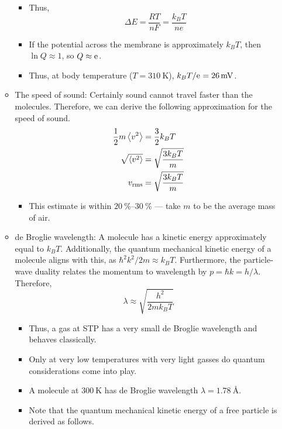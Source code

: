 \documentclass[../notes.tex]{subfiles}
\begin{document}
\begin{itemize}
\begin{itemize}
\begin{itemize}
            \item Thus,
            \begin{equation*}
                \Delta E = \frac{RT}{nF} = \frac{k_BT}{ne}
            \end{equation*}
            \item If the potential across the membrane is approximately $k_BT$, then $\ln Q\approx 1$, so $Q\approx\text{e}^{}$.
            \item Thus, at body temperature ($T=\SI{310}{\kelvin}$), $k_BT/\text{e}^{}=\SI{26}{\milli\volt}$.
        \end{itemize}
        \item The speed of sound: Certainly sound cannot travel faster than the molecules. Therefore, we can derive the following approximation for the speed of sound.
        \begin{align*}
            \frac{1}{2}m\left\langle{v^2}\right\rangle &= \frac{3}{2}k_BT\\
            \sqrt{\left\langle{v^2}\right\rangle} &= \sqrt{\frac{3k_BT}{m}}\\
            v_\text{rms} &= \sqrt{\frac{3k_BT}{m}}
        \end{align*}
        \begin{itemize}
            \item This estimate is within $\SIrange{20}{30}{\percent}$ --- take $m$ to be the average mass of air.
        \end{itemize}
        \item de Broglie wavelength: A molecule has a kinetic energy approximately equal to $k_BT$. Additionally, the quantum mechanical kinetic energy of a molecule aligns with this, as $\hbar^2k^2/2m\approx k_BT$. Furthermore, the particle-wave duality relates the momentum to wavelength by $p=\hbar k=h/\lambda$. Therefore,
        \begin{equation*}
            \lambda \approx \sqrt{\frac{h^2}{2mk_BT}}
        \end{equation*}
        \begin{itemize}
            \item Thus, a gas at STP has a very small de Broglie wavelength and behaves classically.
            \item Only at very low temperatures with very light gasses do quantum considerations come into play.
            \item A  molecule at $\SI{300}{\kelvin}$ has de Broglie wavelength $\lambda=\SI{1.78}{\angstrom}$.
            \item Note that the quantum mechanical kinetic energy of a free particle is derived as follows.

\end{itemize}
\end{itemize}
\end{itemize}
\end{document}
